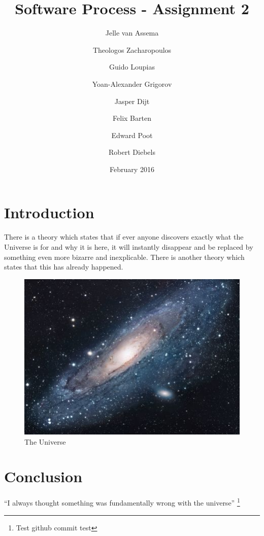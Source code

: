 \documentclass{article}
\title{Software Process - Assignment 2}
\author{
    Jelle van Assema\\
    \and
    Theologos Zacharopoulos\\
    \and
    Guido Loupias\\
    \and 
    Yoan-Alexander Grigorov\\
    \and 
    Jasper Dijt\\
    \and 
    Felix Barten\\
    \and 
    Edward Poot\\ 
    \and 
    Robert Diebels
}
\date{February 2016}
\begin{document}
\maketitle

\section{Introduction}
There is a theory which states that if ever anyone discovers exactly what the Universe is for and why it is here, it will instantly disappear and be replaced by something even more bizarre and inexplicable.
There is another theory which states that this has already happened.

\begin{figure}[h!]
\centering
\includegraphics[scale=1.7]{universe.jpg}
\caption{The Universe}
\label{fig:univerise}
\end{figure}

\section{Conclusion}
``I always thought something was fundamentally wrong with the universe'' \citep[All pages]{adams1995hitchhiker}\footnote{Test github commit test}



\end{document}
